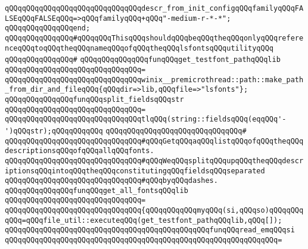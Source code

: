 \verb|qQQqqQQqqQQqqQQqqQQqqQQqqQQqqQQqdescr_from_init_configqQQqfamilyqQQqFALSEqQQqFALSEqQQq=>qQQqfamilyqQQq+qQQq"-medium-r-*-*";|\newline
\verb|qQQqqQQqqQQqqQQqend;|\newline
\newline
\newline
\verb|qQQqqQQqqQQqqQQq#qQQqqQQqThisqQQqshouldqQQqbeqQQqtheqQQqonlyqQQqreferenceqQQqtoqQQqtheqQQqnameqQQqofqQQqtheqQQqlsfontsqQQqutilityqQQq|\newline
\verb|qQQqqQQqqQQqqQQq#|\newline
\verb|qQQqqQQqqQQqqQQqfunqQQqget_testfont_pathqQQqlib|\newline
\verb|qQQqqQQqqQQqqQQqqQQqqQQqqQQqqQQq=|\newline
\verb|qQQqqQQqqQQqqQQqqQQqqQQqqQQqqQQqwinix__premicrothread::path::make_path_from_dir_and_fileqQQq{qQQqdir=>lib,qQQqfile=>"lsfonts"};|\newline
\newline
\verb|qQQqqQQqqQQqqQQqfunqQQqsplit_fieldsqQQqstr|\newline
\verb|qQQqqQQqqQQqqQQqqQQqqQQqqQQqqQQq=|\newline
\verb|qQQqqQQqqQQqqQQqqQQqqQQqqQQqqQQqtlqQQq(string::fieldsqQQq(eqqQQq'-')qQQqstr);qQQqqQQqqQQq|\newline
\verb|qQQqqQQqqQQqqQQqqQQqqQQqqQQqqQQq#|\newline
\verb|qQQqqQQqqQQqqQQqqQQqqQQqqQQqqQQq#qQQqGetqQQqaqQQqlistqQQqofqQQqtheqQQqdescriptionsqQQqofqQQqallqQQqfonts.|\newline
\verb|qQQqqQQqqQQqqQQqqQQqqQQqqQQqqQQq#qQQqWeqQQqsplitqQQqupqQQqtheqQQqdescriptionsqQQqintoqQQqtheqQQqconstitutingqQQqfieldsqQQqseparated|\newline
\verb|qQQqqQQqqQQqqQQqqQQqqQQqqQQqqQQq#qQQqbyqQQqdashes.|\newline
\newline
\newline
\verb|qQQqqQQqqQQqqQQqfunqQQqget_all_fontsqQQqlib|\newline
\verb|qQQqqQQqqQQqqQQqqQQqqQQqqQQqqQQq=|\newline
\verb|qQQqqQQqqQQqqQQqqQQqqQQqqQQqqQQq{qQQqqQQqqQQqmyqQQq(si,qQQqso)qQQqqQQqqQQq=qQQqfile_util::executeqQQq(get_testfont_pathqQQqlib,qQQq[]);|\newline
\newline
\verb|qQQqqQQqqQQqqQQqqQQqqQQqqQQqqQQqqQQqqQQqqQQqqQQqfunqQQqread_emqQQqsi|\newline
\verb|qQQqqQQqqQQqqQQqqQQqqQQqqQQqqQQqqQQqqQQqqQQqqQQqqQQqqQQqqQQqqQQq=|\newline

